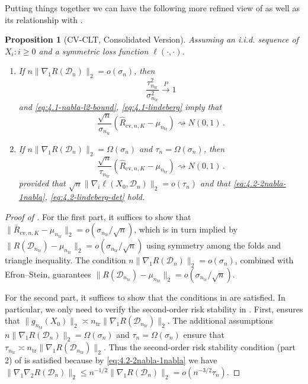 \documentclass[11pt]{article}
\theoremstyle{plain}
\newtheorem{proposition}[theorem]{Proposition}
\newcommand{\cv}{{\mathrm{cv}}}
\newcommand{\tr}{{\mathrm{tr}}}
\newcommand{\D}{{\mathcal{D}}}
\begin{document}
Putting things together we can have the following more refined view of  as well as its relationship with .
\begin{proposition}
    [CV-CLT, Consolidated Version]\label{pro:4.2-cv-clt-consolidate}
Assuming an i.i.d. sequence of $X_i:i\ge 0$ and a symmetric loss function $\ell(\cdot,\cdot)$.
\begin{enumerate}
    \item If $n\|\nabla_1 R(\D_{n})\|_2=o(\sigma_{n})$, then
    $$\frac{\tau_{n_\tr}^2}{\sigma_{n_\tr}^2}\stackrel{P}{\rightarrow}1$$
    and \eqref{eq:4.1-nabla-l2-bound}, \eqref{eq:4.1-lindeberg} imply that
    $$
   \frac{\sqrt{n}}{\sigma_{n_\tr}}(\hat R_{\cv,n,K}-\mu_{n_\tr})\rightsquigarrow N(0,1)\,. 
    $$
    \item If $n\|\nabla_1 R(\D_n)\|_2=\Omega(\sigma_n)$ and $\tau_n=\Omega(\sigma_n)$, then
    $$
   \frac{\sqrt{n}}{\tau_{n_\tr}}(\hat R_{\cv,n,K}-\mu_{n_\tr})\rightsquigarrow N(0,1)\,.
    $$
    provided that $\sqrt{n}\|\nabla_i\ell(X_0,\D_n)\|_2=o(\tau_n)$ and that \eqref{eq:4.2-2nabla-1nabla}, \eqref{eq:4.2-lindeberg-det} hold.
\end{enumerate}
\end{proposition}

\begin{proof}
    [Proof of ]
    For the first part, it suffices to show that $\|\bar R_{\cv,n,K}-\mu_{n_\tr}\|_2=o(\sigma_{n_\tr}/\sqrt{n})$, which is in turn implied by
    $\|R(\D_{n_\tr})-\mu_{n_\tr}\|_2=o(\sigma_{n_\tr}/\sqrt{n})$ using symmetry among the folds and triangle inequality.  The condition $n\|\nabla_1 R(\D_{n})\|_2=o(\sigma_{n})$, combined with Efron--Stein, guarantees $\|R(\D_{n_\tr})-\mu_{n_\tr}\|_2=o(\sigma_{n_\tr}/\sqrt{n})$.

    For the second part, it suffices to show that the conditions in  are satisfied.  In particular, we only need to verify the second-order risk stability in . First,  ensures that $\|g_{n_\tr}(X_0)\|_2\asymp n_\tr\|\nabla_1 R(\D_{n_\tr})\|_2$. The additional assumptions $n\|\nabla_1 R(\D_n)\|_2=\Omega(\sigma_n)$ and $\tau_n=\Omega(\sigma_n)$ ensure that $\tau_{n_\tr}\asymp n_\tr\|\nabla_1 R(\D_{n_\tr})\|_2$. Thus the second-order risk stability condition (part 2) of  is satisfied because by \eqref{eq:4.2-2nabla-1nabla} we have $\|\nabla_1\nabla_2 R(\D_n)\|_2\le n^{-1/2}\|\nabla_1 R(\D_n)\|_2=o(n^{-3/2}\tau_n)$.
\end{proof}
\end{document}

